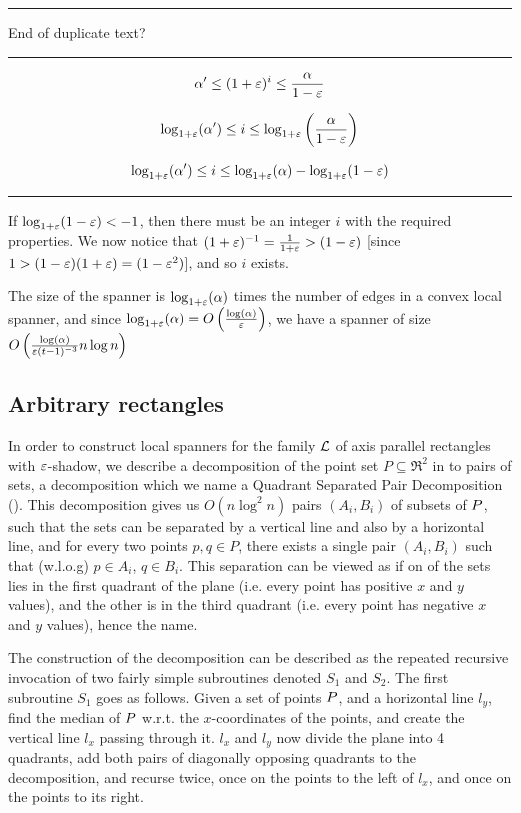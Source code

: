 \documentclass[12pt]{article}%
\begin{document}
\hrule

End of duplicate text?
\hrule



$$\alpha' \leq (1+\varepsilon)^i \leq \frac{\alpha}{1-\varepsilon}$$

$$\log_{1+\varepsilon}(\alpha') \leq i \leq \log_{1+\varepsilon}\left(\frac{\alpha}{1-\varepsilon}\right)$$

$$\log_{1+\varepsilon}(\alpha') \leq i \leq \log_{1+\varepsilon}(\alpha) - \log_{1+\varepsilon}(1-\varepsilon)$$

\hrule

If $\log_{1+\varepsilon}(1-\varepsilon)<-1$, then there must be an integer $i$ with
the required properties. We now notice that
$(1+\varepsilon)^{-1}=\frac{1}{1+\varepsilon}>(1-\varepsilon)$ [since
$1>(1-\varepsilon)(1+\varepsilon)=(1-\varepsilon^2)$], and so $i$ exists.

The size of the spanner is $\log_{1+\varepsilon}(\alpha)$ times the number of
edges in a convex local spanner, and since
$\log_{1+\varepsilon}(\alpha)=O\left(\frac{\log(\alpha)}{\varepsilon}\right)$, we
have a spanner of size
$O\left(\frac{\log(\alpha)}{\varepsilon (t-1)^{-3}}n\log n\right)$


\subsection{Arbitrary rectangles}

In order to construct local spanners for the family $\mathcal{L}$ of axis
parallel rectangles with $\varepsilon$-shadow, we describe a decomposition of
the point set $P\subseteq \Re^2$ in to pairs of sets, a decomposition
which we name a Quadrant Separated Pair Decomposition (\QSPD). This
decomposition gives us $O(n\log^2n)$ pairs $(A_i,B_i)$ of subsets of
$P$, such that the sets can be separated by a vertical line and also
by a horizontal line, and for every two points $p,q\in P$, there
exists a single pair $(A_i,B_i)$ such that (w.l.o.g) $p\in A_i$,
$q\in B_i$. This separation can be viewed as if on of the sets lies in
the first quadrant of the plane (i.e. every point has positive $x$ and
$y$ values), and the other is in the third quadrant (i.e. every point
has negative $x$ and $y$ values), hence the name.

The construction of the decomposition can be described as the repeated
recursive invocation of two fairly simple subroutines denoted $S_1$
and $S_2$. The first subroutine $S_1$ goes as follows. Given a set of
points $P$, and a horizontal line $l_y$, find the median of $P$
w.r.t. the $x$-coordinates of the points, and create the vertical line
$l_x$ passing through it. $l_x$ and $l_y$ now divide the plane into 4
quadrants, add both pairs of diagonally opposing quadrants to the
decomposition, and recurse twice, once on the points to the left of
$l_x$, and once on the points to its right.
\end{document}
